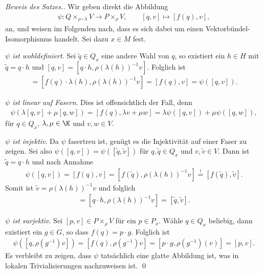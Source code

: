 \documentclass[%
	paper=a5,%
	fleqn,%
	DIV=18,%
	BCOR=0mm,
	fontsize=11pt,
	titlepage=false,%
	bibliography=totoc,
	DIV=18,%
	twoside=true,
	pdftitle=Riemannsche Geometrie,
	pdfauthor=Uwe Semmelmann,
	numbers=noendperiod]%
	{scrbook}
\begin{document}
\begin{proof}[Beweis des Satzes.]
Wir geben direkt die Abbildung
\begin{align*}
\psi\colon Q\times_{\rho\circ\lambda} V \to P\times_\rho V,\qquad
[q,v]\mapsto [f(q),v],
\end{align*}
an, und weisen im Folgenden nach, dass es sich dabei um einen 
Vektorbündel-Isomorphismus handelt. Sei dazu $x\in M$ fest.

\textit{$\psi$ ist wohldefiniert}. Sei $\tilde{q}\in Q_x$ eine andere Wahl von
$q$, so existiert ein $h\in H$ mit $\tilde{q} = q\cdot h$ und
$[q,v] = [q\cdot h,\rho(\lambda(h))^{-1}v]$. Folglich ist
\begin{align*}
[f(q\cdot h),\rho(\lambda(h))^{-1}v] = 
[f(q)\cdot\lambda(h),\rho(\lambda(h))^{-1}v] = [f(q),v] = \psi([q,v]).
\end{align*}

\textit{$\psi$ ist linear auf Fasern}. Dies ist offensichtlich der Fall, denn
\begin{align*}
\psi(\lambda[q,v] + \mu[q,w]) = [f(q),\lambda v + \mu w]
= \lambda\psi([q,v]) + \mu\psi([q,w]),
\end{align*}
für $q\in Q_x$, $\lambda,\mu\in \K$ und $v,w\in V$.

\textit{$\psi$ ist injektiv}. Da $\psi$ fasertreu ist, genügt es die
Injektivität auf einer Faser zu zeigen. Sei also $\psi([q,v]) =
\psi([\tilde{q},\tilde{v}])$ für $q,\tilde{q}\in Q_x$ und $v,\tilde{v}\in V$.
Dann ist $\tilde{q} = q\cdot h$ und nach Annahme
\begin{align*}
\psi([q,v]) = [f(q),v] = [f(\tilde{q}),\rho(\lambda(h))^{-1}v]
\overset{!}{=}[f(\tilde{q}),\tilde{v}].
\end{align*}
Somit ist $\tilde{v} = \rho(\lambda(h))^{-1}v$ und folglich
\begin{align*}
[q,v] = [q\cdot h,\rho(\lambda(h))^{-1}v] = [\tilde{q},\tilde{v}].
\end{align*}

\textit{$\psi$ ist surjektiv}. Sei $[p,v]\in P\times_\rho V$ für ein $p\in P_x$.
Wähle $q\in Q_x$ beliebig, dann existiert ein $g\in G$, so dass $f(q) = p\cdot
g$. Folglich ist
\begin{align*}
\psi([q,\rho(g^{-1})v]) = [f(q),\rho(g^{-1})v]
= [p\cdot g,\rho(g^{-1})(v)] = [p,v].
\end{align*}
Es verbleibt zu zeigen, dass $\psi$ tatsächlich eine glatte Abbildung ist,
was in lokalen Trivialisierungen nachzuweisen ist.
\qed
\end{proof}
\end{document}
